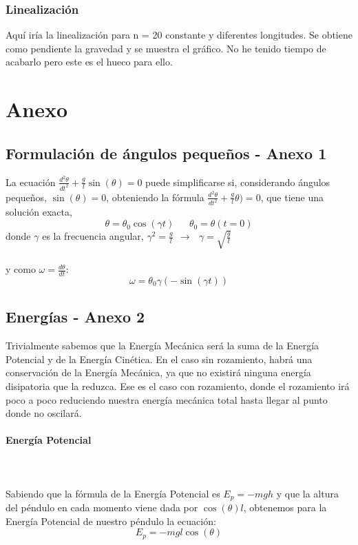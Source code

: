 \documentclass{article}
\begin{document}
\subsubsection{Linealización}
Aquí iría la linealización para n = 20 constante y diferentes longitudes. Se obtiene como pendiente la gravedad y se muestra el gráfico. No he tenido tiempo de acabarlo pero este es el hueco para ello.


\pagebreak
\section{Anexo}
\subsection{Formulación de ángulos pequeños - Anexo 1}
    La ecuación $\frac{d^{2}\theta}{dt^{2}} + \frac{g}{l} \sin(\theta) = 0$ puede simplificarse si, considerando ángulos pequeños, $\sin(\theta) = 0$, obteniendo la fórmula $\frac{d^{2}\theta}{dt^{2}} + \frac{g}{l} \theta) = 0$, que tiene una solución exacta, \[ \boxed{\theta = \theta_0 \cos(\gamma t)\ \ \ \ \ \ \ \theta_0 = \theta (t = 0)}\] donde $\gamma$ es la frecuencia angular, $\gamma^{2} = \frac{g}{l} \ \ \longrightarrow\ \ \ \gamma = \sqrt{\frac{g}{l}}$\\\\
    y como $\omega = \frac{d\theta}{dt}$: \[\boxed{\omega = \theta_0 \gamma \left(-\sin(\gamma t)\right)} \]

\subsection{Energías - Anexo 2}
    Trivialmente sabemos que la Energía Mecánica será la suma de la Energía Potencial y de la Energía Cinética. En el caso sin rozamiento, habrá una conservación de la Energía Mecánica, ya que no existirá ninguna energía disipatoria que la reduzca. Ese es el caso con rozamiento, donde el rozamiento irá poco a poco reduciendo nuestra energía mecánica total hasta llegar al punto donde no oscilará.
        \paragraph{Energía Potencial}\mbox{}\\\\
            Sabiendo que la fórmula de la Energía Potencial es $E_{p} = -m g h$ y que la altura del péndulo en cada momento viene dada por $\cos(\theta)l$, obtenemos para la Energía Potencial de nuestro péndulo la ecuación: \\\[ \boxed{E_{p} = -m g l \cos(\theta)}\]
\end{document}
